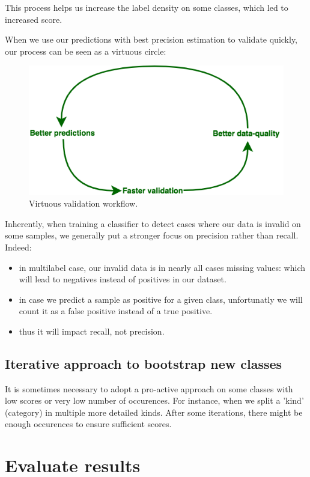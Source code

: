 This process helps us increase the label density on some classes, which led to increased score.

When we use our predictions with best precision estimation to validate quickly, our process can be seen as a virtuous circle:
\begin{figure}[H]
\centering
\includegraphics[scale=0.6]{./images/incompletely-labeled/virtuous-circle.png}
\caption{Virtuous validation workflow.}
\end{figure}

Inherently, when training a classifier to detect cases where our data is invalid on some samples, we generally put a stronger focus on precision rather than recall. Indeed:
\begin{itemize}
	\item in multilabel case, our invalid data is in nearly all cases missing values: which will lead to negatives instead of positives in our dataset.
	\item in case we predict a sample as positive for a given class, unfortunatly we will count it as a false positive instead of a true positive.
	\item thus it will impact recall, not precision.
\end{itemize}

\subsection{Iterative approach to bootstrap new classes}

It is sometimes necessary to adopt a pro-active approach on some classes with low scores or very low number of occurences. 
For instance, when we split a 'kind' (category) in multiple more detailed kinds.
After some iterations, there might be enough occurences to ensure sufficient scores.

\section{Evaluate results}

